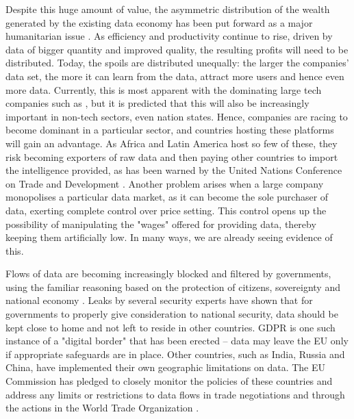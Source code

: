 Despite this huge amount of value, the asymmetric distribution of the wealth generated by the existing data economy has been put forward as a major humanitarian issue \cite{TheWinner2020Feb}. As efficiency and productivity continue to rise, driven by data of bigger quantity and improved quality, the resulting profits will need to be distributed. Today, the spoils are distributed unequally: the larger the companies' data set, the more it can learn from the data, attract more users and hence even more data. Currently, this is most apparent with the dominating large tech companies such as , but it is predicted that this will also be increasingly important in non-tech sectors, even nation states. Hence, companies are racing to become dominant in a particular sector, and countries hosting these platforms will gain an advantage. As Africa and Latin America host so few of these, they risk becoming exporters of raw data and then paying other countries to import the intelligence provided, as has been warned by the United Nations Conference on Trade and Development \cite{TheWinner2020Feb}. Another problem arises when a large company monopolises a particular data market, as it can become the sole purchaser of data, exerting complete control over price setting. This control opens up  the possibility of manipulating the "wages" offered for providing data, thereby keeping them artificially low. In many ways, we are already seeing evidence of this. 


Flows of data are becoming increasingly blocked and filtered by governments, using the familiar reasoning based on the protection of citizens, sovereignty and national economy \cite{VirtualNationalism2020Feb}. Leaks by several security experts have shown that for governments to properly give consideration to national security,  data should be kept close to home and not left to reside in other countries. GDPR is one such instance of a "digital border" that has been erected -- data may leave the EU only if appropriate safeguards are in place. Other countries, such as India, Russia and China, have implemented their own geographic limitations on data. The EU Commission has pledged to closely monitor the policies of these countries and address any limits or restrictions to data flows in trade negotiations and through the actions in the World Trade Organization \cite{EUWhitePaperAI2020Feb}.

